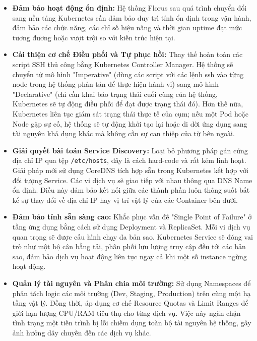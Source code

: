 \begin{itemize}
    \item \textbf{Đảm bảo hoạt động ổn định:} Hệ thống Florus sau quá trình chuyển đổi sang nền tảng Kubernetes cần đảm bảo duy trì tính ổn định trong vận hành, đảm bảo các chức năng, các chỉ số hiệu năng và thời gian uptime đạt mức tương đương hoặc vượt trội so với kiến trúc hiện tại.

    \item \textbf{Cải thiện cơ chế Điều phối và Tự phục hồi:} Thay thế hoàn toàn các script SSH thủ công bằng Kubernetes Controller Manager. Hệ thống sẽ chuyển từ mô hình "Imperative" (dùng các script với các lệnh ssh vào từng node trong hệ thống phân tán để thực hiện hành vi) sang mô hình "Declarative" (chỉ cần khai báo trạng thái cuối cùng của hệ thống, Kubernetes sẽ tự động điều phối để đạt được trạng thái đó). Hơn thế nữa, Kubernetes liên tục giám sát trạng thái thực tế của cụm; nếu một Pod hoặc Node gặp sự cố, hệ thống sẽ tự động khởi tạo lại hoặc di dời ứng dụng sang tài nguyên khả dụng khác mà không cần sự can thiệp của từ bên ngoài.

    \item \textbf{Giải quyết bài toán Service Discovery:} Loại bỏ phương pháp gán cứng địa chỉ IP qua tệp \texttt{/etc/hosts}, đây là cách hard-code và rất kém linh hoạt. Giải pháp mới sử dụng CoreDNS tích hợp sẵn trong Kubernetes kết hợp với đối tượng Service. Các vi dịch vụ sẽ giao tiếp với nhau thông qua DNS Name ổn định. Điều này đảm bảo kết nối giữa các thành phần luôn thông suốt bất kể sự thay đổi về địa chỉ IP hay vị trí vật lý của các Container bên dưới.

    \item \textbf{Đảm bảo tính sẵn sàng cao:} Khắc phục vấn đề "Single Point of Failure" ở tầng ứng dụng bằng cách sử dụng Deployment và ReplicaSet. Mỗi vi dịch vụ quan trọng sẽ được cấu hình chạy đa bản sao. Kubernetes Service sẽ đóng vai trò như một bộ cân bằng tải, phân phối lưu lượng truy cập đều tới các bản sao, đảm bảo dịch vụ hoạt động liên tục ngay cả khi một số instance ngừng hoạt động.

    \item \textbf{Quản lý tài nguyên và Phân chia môi trường:} Sử dụng Namespaces để phân tách logic các môi trường (Dev, Staging, Production) trên cùng một hạ tầng vật lý. Đồng thời, áp dụng cơ chế Resource Quotas và Limit Ranges để giới hạn lượng CPU/RAM tiêu thụ cho từng dịch vụ. Việc này ngăn chặn tình trạng một tiến trình bị lỗi chiếm dụng toàn bộ tài nguyên hệ thống, gây ảnh hưởng dây chuyền đến các dịch vụ khác.

\end{itemize}

